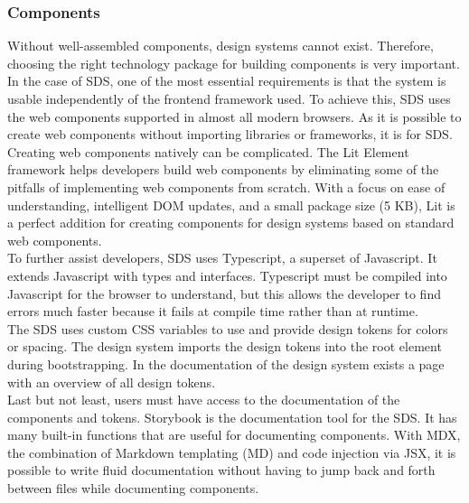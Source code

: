 \subsubsection{Components} \label{sds-component}
Without well-assembled components, design systems cannot exist. Therefore, choosing the right technology package for building components is very important. In the case of \ac{SDS}, one of the most essential requirements is that the system is usable independently of the frontend framework used. To achieve this, \ac{SDS} uses the web components supported in almost all modern browsers. As it is possible to create web components without importing libraries or frameworks, it is for \ac{SDS}. \citep{mdn_web_component_nodate} \\

Creating web components natively can be complicated. The Lit Element framework helps developers build web components by eliminating some of the pitfalls of implementing web components from scratch. With a focus on ease of understanding, intelligent DOM updates, and a small package size (5 KB), Lit is a perfect addition for creating components for design systems based on standard web components. \citep{lit_nodate} \\

To further assist developers, \ac{SDS} uses Typescript, a superset of Javascript. It extends Javascript with types and interfaces. Typescript must be compiled into Javascript for the browser to understand, but this allows the developer to find errors much faster because it fails at compile time rather than at runtime. \citep{microsoft_typescript_nodate} \\

The \ac{SDS} uses custom CSS variables to use and provide design tokens for colors or spacing. The design system imports the design tokens into the root element during bootstrapping. In the documentation of the design system exists a page with an overview of all design tokens. \citep{mdn_css_vars_nodate} \\

Last but not least, users must have access to the documentation of the components and tokens. Storybook is the documentation tool for the \ac{SDS}. It has many built-in functions that are useful for documenting components. With MDX, the combination of Markdown templating (MD) and code injection via JSX, it is possible to write fluid documentation without having to jump back and forth between files while documenting components. \citep{otander_markdown_2017} \\

